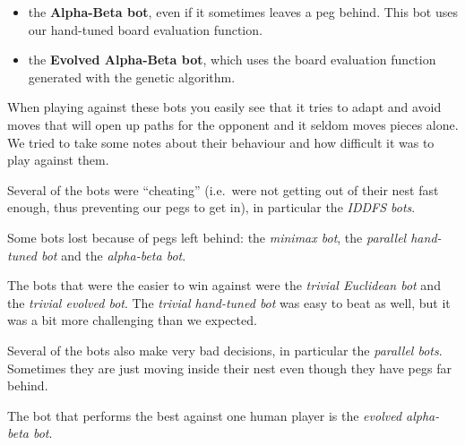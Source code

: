 \begin{itemize}
  \item the \textbf{Alpha-Beta bot}, even if it sometimes leaves a peg behind.
        This bot uses our hand-tuned board evaluation function.
  \item the \textbf{Evolved Alpha-Beta bot}, which uses the board evaluation
        function generated with the genetic algorithm.
\end{itemize}

When playing against these bots you easily see that it tries to adapt and avoid
moves that will open up paths for the opponent and it seldom moves pieces alone.
We tried to take some notes about their
behaviour and how difficult it was to play against them.

Several of the bots were ``cheating'' (i.e.~were not getting out of their
nest fast enough, thus preventing our pegs to get in), in particular the
\textit{IDDFS bots}.

Some bots lost because of pegs left behind: the \textit{minimax bot}, the
\textit{parallel hand-tuned bot} and the \textit{alpha-beta bot}.

The bots that were the easier to win against were the \textit{trivial Euclidean bot} and
the \textit{trivial evolved bot}. The \textit{trivial hand-tuned bot} was easy
to beat as well, but it was a bit more challenging than we expected.

Several of the bots also make very bad decisions, in particular the
\textit{parallel bots}. Sometimes they are just moving inside their
nest even though they have pegs far behind.

The bot that performs the best against one human player is the
\textit{evolved alpha-beta bot}.
